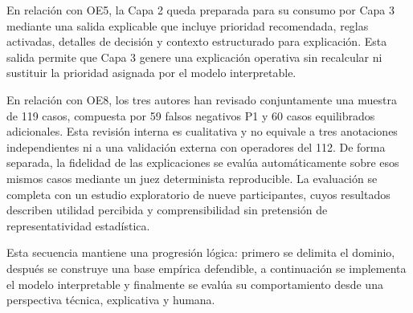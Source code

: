 En relación con OE5, la Capa 2 queda preparada para su consumo por Capa 3 mediante una salida explicable que incluye prioridad recomendada, reglas activadas, detalles de decisión y contexto estructurado para explicación. Esta salida permite que Capa 3 genere una explicación operativa sin recalcular ni sustituir la prioridad asignada por el modelo interpretable.

En relación con OE8, los tres autores han revisado conjuntamente una muestra de 119 casos, compuesta por 59 falsos negativos P1 y 60 casos equilibrados adicionales. Esta revisión interna es cualitativa y no equivale a tres anotaciones independientes ni a una validación externa con operadores del 112. De forma separada, la fidelidad de las explicaciones se evalúa automáticamente sobre esos mismos casos mediante un juez determinista reproducible. La evaluación se completa con un estudio exploratorio de nueve participantes, cuyos resultados describen utilidad percibida y comprensibilidad sin pretensión de representatividad estadística.

Esta secuencia mantiene una progresión lógica: primero se delimita el dominio, después se construye una base empírica defendible, a continuación se implementa el modelo interpretable y finalmente se evalúa su comportamiento desde una perspectiva técnica, explicativa y humana.

